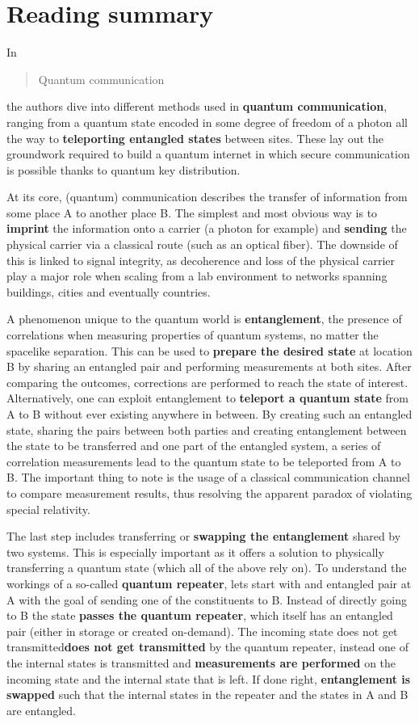 \documentclass{alex_summary}
\begin{document}
\section*{Reading summary}

In \blockcquote{gisin_quantum_2007}{Quantum communication} the authors dive into different methods used in \textbf{quantum communication}, ranging from \textbf{} a quantum state encoded in some degree of freedom of a photon all the way to \textbf{teleporting entangled states} between sites. These lay out the groundwork required to build a quantum internet in which secure communication is possible thanks to quantum key distribution.

At its core, (quantum) communication describes the transfer of information from some place A to another place B. The simplest and most obvious way is to \textbf{imprint} the information onto a carrier (a photon for example) and \textbf{sending} the physical carrier via a classical route (such as an optical fiber). The downside of this is linked to signal integrity, as decoherence and loss of the physical carrier play a major role when scaling from a lab environment to networks spanning buildings, cities and eventually countries.

A phenomenon unique to the quantum world is \textbf{entanglement}, the presence of correlations when measuring properties of quantum systems, no matter the spacelike separation. This can be used to \textbf{prepare the desired state} at location B by sharing an entangled pair and performing measurements at both sites. After comparing the outcomes, corrections are performed to reach the state of interest. Alternatively, one can exploit entanglement to \textbf{teleport a quantum state} from A to B without ever existing anywhere in between. By creating such an entangled state, sharing the pairs between both parties and creating entanglement between the state to be transferred and one part of the entangled system, a series of correlation measurements lead to the quantum state to be teleported from A to B. The important thing to note is the usage of a classical communication channel to compare measurement results, thus resolving the apparent paradox of violating special relativity.

The last step includes transferring or \textbf{swapping the entanglement} shared by two systems. This is especially important as it offers a solution to physically transferring a quantum state (which all of the above rely on). To understand the workings of a so-called \textbf{quantum repeater}, lets start with and entangled pair at A with the goal of sending one of the constituents to B. Instead of directly going to B the state \textbf{passes the quantum repeater}, which itself has an entangled pair (either in storage or created on-demand). The incoming state does not get transmitted\textbf{does not get transmitted} by the quantum repeater, instead one of the internal states is transmitted and \textbf{measurements are performed} on the incoming state and the internal state that is left. If done right, \textbf{entanglement is swapped} such that the internal states in the repeater and the states in A and B are entangled. 	
\end{document}
